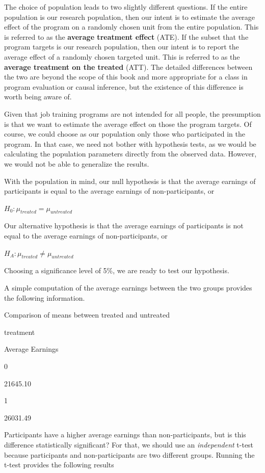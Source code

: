 \documentclass[
]{book}
\begin{document}
The choice of population leads to two slightly different questions. If the entire population is our research population, then our intent is to estimate the average effect of the program on a randomly chosen unit from the entire population. This is referred to as the \textbf{average treatment effect} (ATE). If the subset that the program targets is our research population, then our intent is to report the average effect of a randomly chosen targeted unit. This is referred to as the \textbf{average treatment on the treated} (ATT). The detailed differences between the two are beyond the scope of this book and more appropriate for a class in program evaluation or causal inference, but the existence of this difference is worth being aware of.

Given that job training programs are not intended for all people, the presumption is that we want to estimate the average effect on those the program targets. Of course, we could choose as our population only those who participated in the program. In that case, we need not bother with hypothesis tests, as we would be calculating the population parameters directly from the observed data. However, we would not be able to generalize the results.

With the population in mind, our null hypothesis is that the average earnings of participants is equal to the average earnings of non-participants, or

\(H_0: \mu_{treated} = \mu_{untreated}\)

Our alternative hypothesis is that the average earnings of participants is not equal to the average earnings of non-participants, or

\(H_A: \mu_{treated} \neq \mu_{untreated}\)

Choosing a significance level of 5\%, we are ready to test our hypothesis.

A simple computation of the average earnings between the two groups provides the following information.

\label{tab:jobtrainsum}Comparison of means between treated and untreated

treatment

Average Earnings

0

21645.10

1

26031.49

Participants have a higher average earnings than non-participants, but is this difference statistically significant? For that, we should use an \emph{independent} t-test because participants and non-participants are two different groups. Running the t-test provides the following results
\end{document}
